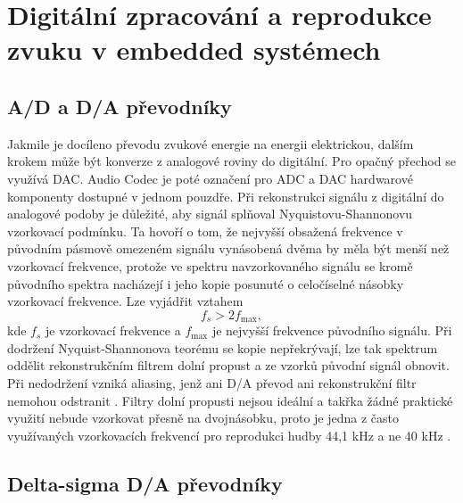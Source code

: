 \chapter{Digitální zpracování a reprodukce zvuku v embedded systémech}

\section{A/D a D/A převodníky}

Jakmile je docíleno převodu zvukové energie na energii elektrickou, dalším krokem může být konverze z analogové roviny do digitální. Pro opačný přechod se využívá \ac{DAC}. Audio Codec je poté označení pro ADC a DAC hardwarové komponenty dostupné v jednom pouzdře. Při rekonstrukci signálu z digitální do analogové podoby je důležité, aby signál splňoval Nyquistovu-Shannonovu vzorkovací podmínku. Ta hovoří o tom, že nejvyšší obsažená frekvence v původním pásmově omezeném signálu vynásobená dvěma by měla být menší než vzorkovací frekvence, protože ve spektru navzorkovaného signálu se kromě původního spektra nacházejí i jeho kopie posunuté o celočíselné násobky vzorkovací frekvence.
Lze vyjádřit vztahem
\begin{equation}
    f_s > 2f_{\max},
\end{equation}
kde $f_s$ je vzorkovací frekvence a $f_{\max}$ je nejvyšší frekvence původního signálu.
Při dodržení Nyquist-Shannonova teorému se kopie nepřekrývají, lze tak spektrum oddělit rekonstrukčním filtrem dolní propust a ze vzorků původní signál obnovit. Při nedodržení vzniká aliasing, jenž ani D/A převod ani rekonstrukční filtr nemohou odstranit \cite[s.~96--99]{smekal2023}. 
Filtry dolní propusti nejsou ideální a takřka žádné praktické využití nebude vzorkovat přesně na dvojnásobku, proto je jedna z často využívaných vzorkovacích frekvencí pro reprodukci hudby 44,1 kHz a ne 40 kHz \cite{katz2005embedded}.

\section{Delta-sigma D/A převodníky}

